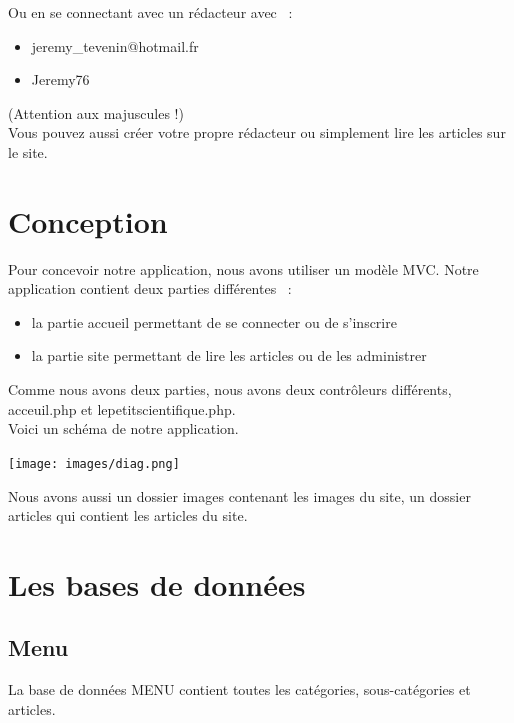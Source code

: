 \documentclass[hidelinks, 12pt,a4paper]{article}
\begin{document}
Ou en se connectant avec un rédacteur avec ~:\\
\begin{itemize}
\item jeremy\_tevenin@hotmail.fr
\item Jeremy76\\
\end{itemize}

(Attention aux majuscules !)\\

Vous pouvez aussi créer votre propre rédacteur ou simplement lire les articles sur le site.

\newpage
\section{Conception}
Pour concevoir notre application, nous avons utiliser un modèle MVC. Notre application contient deux parties différentes ~:\\
\begin{itemize}
\item la partie accueil permettant de se connecter ou de s'inscrire
\item la partie site permettant de lire les articles ou de les administrer
\end{itemize}

Comme nous avons deux parties, nous avons deux contrôleurs différents, acceuil.php et lepetitscientifique.php.\\

Voici un schéma de notre application.\\

\begin{center}
\texttt{[image: images/diag.png]}\\
\end{center}


Nous avons aussi un dossier images contenant les images du site, un dossier articles qui contient les articles du site.
 
\newpage
\section{Les bases de données}
\subsection{Menu}
La base de données MENU contient toutes les catégories, sous-catégories et articles.\\
\end{document}
